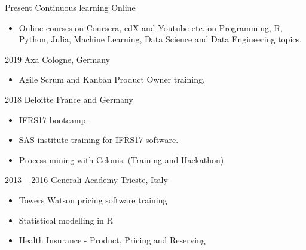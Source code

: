 \documentclass[a4paper,]{fortysecondscv}
\begin{document}
\begin{cvtable}[2]
    \cvitem
    {Present}
    {Continuous learning}
    {Online}
    {
        \vspace{-\topsep}
        \begin{itemize}[nosep, leftmargin=0pt, label={}]
            \item Online courses on Coursera, edX and Youtube etc. on Programming, R, Python, Julia, Machine Learning, Data Science and Data Engineering topics.
        \end{itemize}
    }
    \cvitem
    {2019}
    {Axa}
    {Cologne, Germany}
    {
        \vspace{-\topsep}
        \begin{itemize}[nosep, leftmargin=0pt, label={}]
            \item Agile Scrum and Kanban Product Owner training.
        \end{itemize}
    }
    \cvitem
    {2018}
    {Deloitte}
    {France and Germany}
    {
        \vspace{-\topsep}
        \begin{itemize}[nosep, leftmargin=0pt, label={}]
            \item IFRS17 bootcamp.
            \item SAS institute training for IFRS17 software.
            \item Process mining with Celonis. (Training and Hackathon)
        \end{itemize}
    }
    \cvitem
    {2013 -- 2016}
    {Generali Academy}
    {Trieste, Italy}
    {
        \vspace{-\topsep}
        \begin{itemize}[nosep, leftmargin=0pt, label={}]
            \item Towers Watson pricing software training
            \item Statistical modelling in R
            \item Health Insurance - Product, Pricing and Reserving
        \end{itemize}
    }
\end{cvtable}

\end{document}
